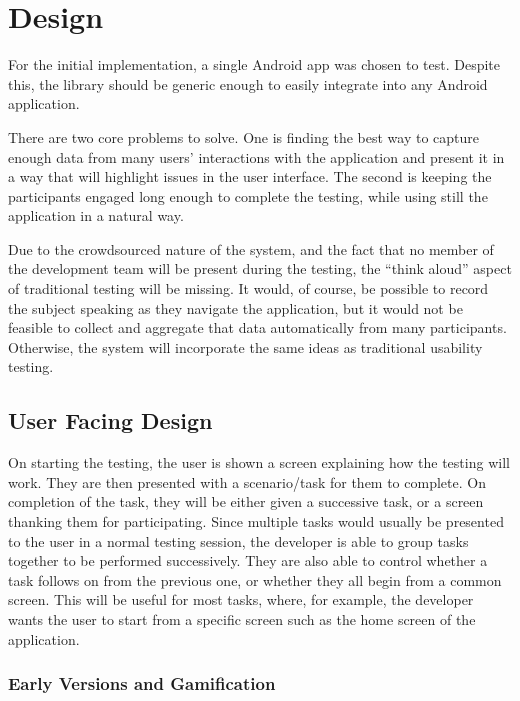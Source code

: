 \chapter{Design}

For the initial implementation, a single Android app was chosen to test. Despite
this, the library should be generic enough to easily integrate into any Android
application.

There are two core problems to solve. One is finding the best way to capture
enough data from many users' interactions with the application and present it in
a way that will highlight issues in the user interface. The second is keeping
the participants engaged long enough to complete the testing, while using still
the application in a natural way.

Due to the crowdsourced nature of the system, and the fact that no member of the
development team will be present during the testing, the ``think aloud'' aspect
of traditional testing will be missing. It would, of course, be possible to
record the subject speaking as they navigate the application, but it would not
be feasible to collect and aggregate that data automatically from many
participants. Otherwise, the system will incorporate the same ideas as
traditional usability testing.

\section{User Facing Design}

On starting the testing, the user is shown a screen explaining how the testing
will work. They are then presented with a scenario/task for them to complete. On
completion of the task, they will be either given a successive task, or a screen
thanking them for participating. Since multiple tasks would usually be presented to the user in a normal testing session, the developer is able to group tasks together to be performed successively. They are also able to control whether a task follows on from the previous one, or whether they all begin from a common screen. This will be useful for most tasks, where, for example, the developer wants the user to start from a specific screen such as the home screen of the application.

\subsection{Early Versions and Gamification}

